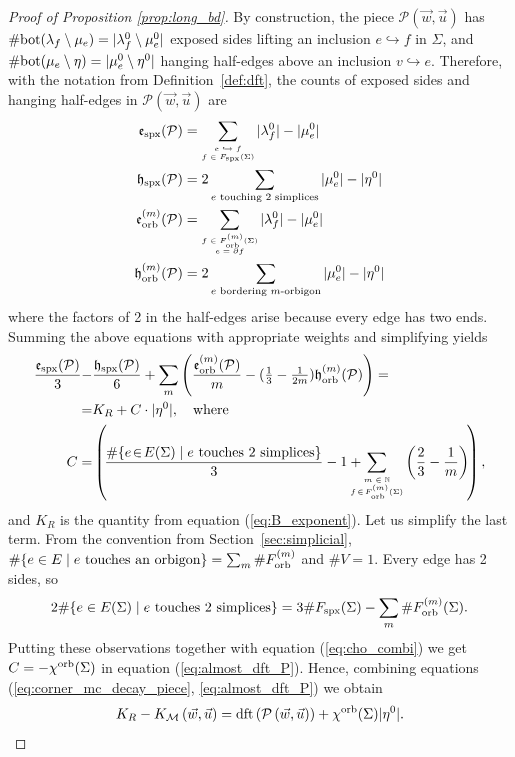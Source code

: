 \documentclass{amsart}
\newcommand{\cho}{\chi^{\textnormal{orb}}}
\newcommand{\dft}{\textnormal{dft}}
\newcommand{\Fspx}{F_{\textnormal{spx}}}
\newcommand{\Forb}[1][m]{F^{(#1)}_{\textnormal{orb}}}
\newcommand{\iterorb}{{\tiny\begin{matrix}m\in\mathbb{N}\\f\!\in\!\Forb(\Sigma)\end{matrix}}}
\newcommand{\tn}{\textnormal}
\begin{document}
\begin{proof}[Proof of Proposition \ref{prop:long_bd}]
By construction, the piece $\mathcal{P}(\vec{w},\vec{u})$ has $\#\tn{bot}(\lambda_f\setminus\mu_e)=|\lambda^0_f\setminus\mu^0_e|$ exposed sides lifting an inclusion $e\hookrightarrow f$ in $\Sigma$, and $\#\tn{bot}(\mu_e\setminus\eta)=|\mu^0_e\setminus\eta^0|$ hanging half-edges above an inclusion $v\hookrightarrow e$. Therefore, with the notation from Definition~\ref{def:dft}, the counts of exposed sides and hanging half-edges in $\mathcal{P}(\vec{w},\vec{u})$ are
\begin{align*}
\mathfrak{e}_\tn{spx}(\mathcal{P})&=\sum_{\tiny\begin{matrix}e\hookrightarrow f\\f\in\Fspx(\Sigma)\end{matrix}}|\lambda^0_f|-|\mu^0_e|\\
\mathfrak{h}_\tn{spx}(\mathcal{P})&=2\sum_{e\tn{ touching 2 simplices}}|\mu^0_e|-|\eta^0|\\
\mathfrak{e}^{(m)}_\tn{orb}(\mathcal{P})&=\sum_{\tiny\begin{matrix}f\in\Forb(\Sigma)\\e=\partial f\end{matrix}}|\lambda^0_f|-|\mu^0_e|\\
\mathfrak{h}^{(m)}_\tn{orb}(\mathcal{P})&=2\sum_{e\tn{ bordering }m\tn{-orbigon}}|\mu^0_e|-|\eta^0|
\end{align*}
where the factors of 2 in the half-edges arise because every edge has two ends. Summing the above equations with appropriate weights and simplifying yields
\begin{align}\begin{split}\label{eq:almost_dft_P}
\frac{\mathfrak{e}_\tn{spx}(\mathcal{P})}{3}-&\frac{\mathfrak{h}_\tn{spx}(\mathcal{P})}{6}+\sum_m\left(\frac{\mathfrak{e}^{(m)}_\tn{orb}(\mathcal{P})}{m}-(\tfrac{1}{3}-\tfrac{1}{2m})\mathfrak{h}^{(m)}_\tn{orb}(\mathcal{P})\right)=\\
=&K_R+C\cdot|\eta^0|,\quad\text{where}\\
C=&\left(\!\frac{\#\{e\!\in\!E(\Sigma)\mid e\text{ touches }2\text{ simplices}\}}{3}-1+\hspace*{-10pt}\sum_\iterorb\left(\frac{2}{3}-\frac{1}{m}\right)\!\right),
\end{split}\end{align}
and $K_R$ is the quantity from equation (\ref{eq:B_exponent}). Let us simplify the last term. From the convention from Section~\ref{sec:simplicial}, $\#\{e\in E\mid e\text{ touches an orbigon}\}=\sum_m\#\Forb$ and $\#V=1$. Every edge has 2 sides, so
\begin{equation*}
2\#\{e\in E(\Sigma)\mid e\text{ touches 2 simplices}\}=3\#\Fspx(\Sigma)-\sum_m\#\Forb(\Sigma).
\end{equation*}
Putting these observations together with equation (\ref{eq:cho_combi}) we get $C=-\cho(\Sigma)$ in equation (\ref{eq:almost_dft_P}). Hence, combining equations (\ref{eq:corner_mc_decay_piece}, \ref{eq:almost_dft_P}) we obtain
\begin{equation*}
K_R-K_\mathcal{M}\left(\vec{w},\vec{u}\right)=\dft\left(\mathcal{P}\left(\vec{w},\vec{u}\right)\right)+\cho(\Sigma)|\eta^0|.
\end{equation*}


\end{proof}
\end{document}
